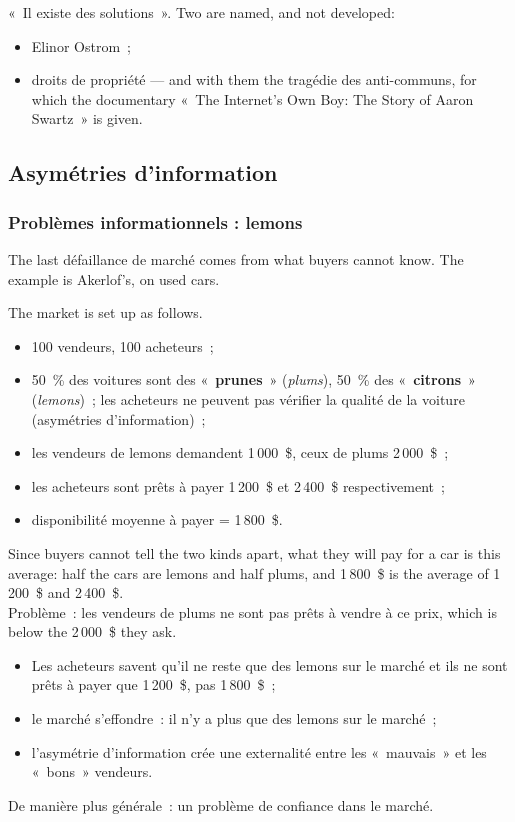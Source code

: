 «~Il existe des solutions~». Two are named, and not developed:
\begin{itemize}
  \item Elinor Ostrom~;
  \item droits de propriété --- and with them the tragédie des anti-communs, for
    which the documentary «~The Internet's Own Boy: The Story of Aaron Swartz~»
    is given.
\end{itemize}

\subsection{Asymétries d'information}

\subsubsection{Problèmes informationnels : lemons}

The last défaillance de marché comes from what buyers cannot know. The example is
Akerlof's, on used cars.

\begin{example}
  The market is set up as follows.
  \begin{itemize}
    \item 100 vendeurs, 100 acheteurs~;
    \item 50~\% des voitures sont des «~\textbf{prunes}~» (\textit{plums}),
      50~\% des «~\textbf{citrons}~» (\textit{lemons})~; les acheteurs ne
      peuvent pas vérifier la qualité de la voiture (asymétries
      d'information)~;
    \item les vendeurs de lemons demandent 1\,000~\$, ceux de plums
      2\,000~\$~;
    \item les acheteurs sont prêts à payer 1\,200~\$ et 2\,400~\$
      respectivement~;
    \item disponibilité moyenne à payer = 1\,800~\$.
  \end{itemize}
  Since buyers cannot tell the two kinds apart, what they will pay for a car is
  this average: half the cars are lemons and half plums, and 1\,800~\$ is the
  average of 1\,200~\$ and 2\,400~\$.\\

  Problème~: les vendeurs de plums ne sont pas prêts à vendre à ce prix, which
  is below the 2\,000~\$ they ask.
  \begin{itemize}
    \item Les acheteurs savent qu'il ne reste que des lemons sur le marché et ils
      ne sont prêts à payer que 1\,200~\$, pas 1\,800~\$~;
    \item le marché s'effondre~: il n'y a plus que des lemons sur le marché~;
    \item l'asymétrie d'information crée une externalité entre les «~mauvais~»
      et les «~bons~» vendeurs.
  \end{itemize}
\end{example}

De manière plus générale~: un problème de confiance dans le marché.
